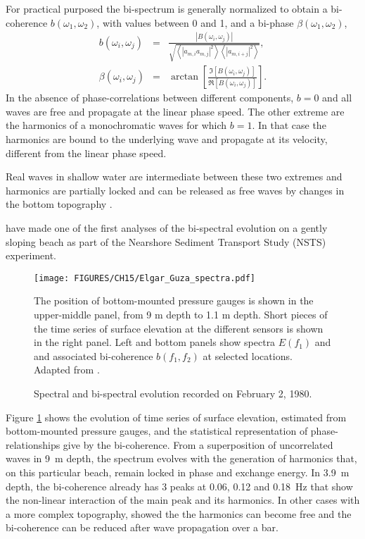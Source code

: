 For practical purposed the bi-spectrum is generally normalized to obtain a bi-coherence $b(\omega_1,\omega_2)$, with values between 0 and 1, 
and a bi-phase $\beta(\omega_1,\omega_2)$, 
\begin{eqnarray}
b(\omega_i,\omega_j)& =&\frac{\left|B(\omega_i,\omega_j)\right|}{\sqrt{ \left\langle  \left|a_{m,i} a_{m,j}\right|^2 \right\rangle 
                             \left\langle \left|a_{m,i+j}\right|^2   \right\rangle}}, \\
 \beta(\omega_i,\omega_j) &=&\arctan \left[\frac{\Im[     B(\omega_i,\omega_j)]}{\Re[     B(\omega_i,\omega_j)]} \right].
\end{eqnarray}
In the absence of phase-correlations between different components, $b=0$ and all waves are free and propagate at the linear phase speed.  
The other extreme are the harmonics of a monochromatic waves for which $b=1$. In that case the harmonics are bound to the underlying wave and propagate at its velocity, different from the linear phase speed. 

Real waves in shallow water are intermediate between these two extremes and harmonics are partially locked and can be released as free waves by changes in the bottom topography \citep[e.g.][]{Senechal&al.2003}.

\cite{Elgar&Guza1985b} have made one of the first analyses of the bi-spectral evolution on a gently sloping beach as part of the 
Nearshore Sediment Transport Study (NSTS) experiment. 
\begin{figure}[htb]
\centerline{\texttt{[image: FIGURES/CH15/Elgar\_Guza\_spectra.pdf]}}
  \caption{Spectral and bi-spectral evolution recorded on February 2, 1980.}
    {The position of bottom-mounted pressure gauges is shown  in  the upper-middle panel, from 9 m depth to 1.1 m depth. 
    Short pieces of the time series of surface elevation at the different sensors is shown in the right panel. 
    Left and bottom panels show spectra $E(f_1)$ and 
    and associated bi-coherence $b(f_1,f_2)$ at selected locations. Adapted 
    from \cite{Elgar&Guza1985b}.}
\label{fig:NSTS_bispectra}
\end{figure}
Figure \ref{fig:NSTS_bispectra} shows the evolution of time series of surface elevation, estimated from bottom-mounted pressure gauges, 
and the statistical representation of phase-relationships give by the bi-coherence. From a superposition of uncorrelated waves in 9~m depth, 
the spectrum evolves with the generation of harmonics that, on this particular beach, remain locked in phase and exchange energy. 
In 3.9~m depth, the bi-coherence already has 3 peaks at 0.06, 0.12 and 0.18~Hz that show the non-linear interaction of the main peak 
and its harmonics. In other cases with a more complex topography, \cite{Senechal&al.2003} showed the the harmonics can 
become free and the bi-coherence can be reduced after wave propagation over a bar. 

